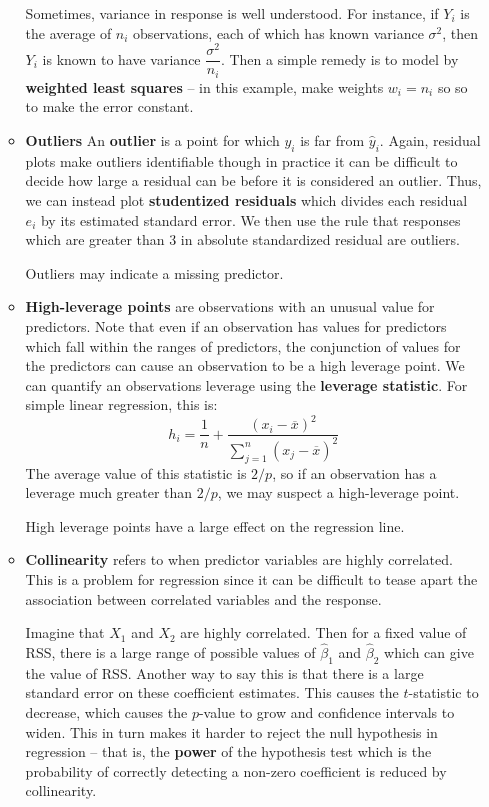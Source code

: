 \documentclass[10pt]{article}
\begin{document}
\begin{enumerate}
\begin{itemize}
		Sometimes, variance in response is well understood.  For instance, if $Y_i$ is the average of $n_i$ observations, each of which has known variance $\sigma^2$, then $Y_i$ is known to have variance $\dfrac{\sigma^2}{n_i}$.  Then a simple remedy is to model by \textbf{weighted least squares} -- in this example, make weights $w_i = n_i$ so so to make the error constant.
		\item \textbf{Outliers}  An \textbf{outlier} is a point for which $y_i$ is far from $\hat y_i$.  Again, residual plots make outliers identifiable though in practice it can be difficult to decide how large a residual can be before it is considered an outlier.  Thus, we can instead plot \textbf{studentized residuals} which divides each residual $e_i$ by its estimated standard error.  We then use the rule that responses which are greater than 3 in absolute standardized residual are outliers.
		
		Outliers may indicate a missing predictor.
		\item \textbf{High-leverage points} are observations with an unusual value for predictors.  Note that even if an observation has values for predictors which fall within the ranges of predictors, the conjunction of values for the predictors can cause an observation to be a high leverage point.  We can quantify an observations leverage using the \textbf{leverage statistic}.  For simple linear regression, this is:
		$$h_i = \dfrac{1}{n} + \dfrac{(x_i - \overline{x})^2}{\sum_{j = 1}^n (x_j - \overline{x})^2}$$
		The average value of this statistic is $2/p$, so if an observation has a leverage much greater than $2/p$, we may suspect a high-leverage point.
		
		High leverage points have a large effect on the regression line.
		
		
		\item \textbf{Collinearity} refers to when predictor variables are highly correlated.  This is a problem for regression since it can be difficult to tease apart the association between correlated variables and the response.
		
		Imagine that $X_1$ and $X_2$ are highly correlated.  Then for a fixed value of RSS, there is a large range of possible values of $\hat \beta_1$ and $\hat \beta_2$ which can give the value of RSS.  Another way to say this is that there is a large standard error on these coefficient estimates.  This causes the $t$-statistic to decrease, which causes the $p$-value to grow and confidence intervals to widen.  This in turn makes it harder to reject the null hypothesis in regression -- that is, the \textbf{power} of the hypothesis test which is the probability of correctly detecting a non-zero coefficient is reduced by collinearity.
		

\end{itemize}
\end{enumerate}
\end{document}
